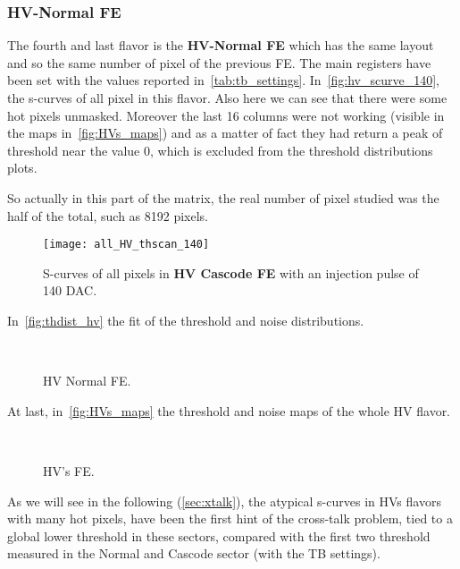 \subsubsection{HV-Normal FE}\label{sec:first_xtalk}

The fourth and last flavor is the \textbf{HV-Normal FE} which has the same layout and so the same number of pixel of the previous FE. The main registers have been set with the values reported in~\autoref{tab:tb_settings}.
In~\autoref{fig:hv_scurve_140}, the s-curves of all pixel in this flavor. Also here we can see that there were some hot pixels unmasked.
Moreover the last 16 columns were not working (visible in the maps in~\autoref{fig:HVs_maps}) and as a matter of fact they had return a peak of threshold near the value 0, which is excluded from the threshold distributions plots.

So actually in this part of the matrix, the real number of pixel studied was the half of the total, such as 8192 pixels.


\begin{figure}[h!]
\centering
\texttt{[image: all\_HV\_thscan\_140]}
\caption{S-curves of all pixels in \textbf{HV Cascode FE} with an injection pulse of 140 DAC.}
\label{fig:hv_scurve_140}
\end{figure}

In~\autoref{fig:thdist_hv} the fit of the threshold and noise distributions.

\begin{figure}[h!]
\centering
{}\quad
{}\\
\caption{HV Normal FE.}
\label{fig:thdist_hv}
\end{figure}

At last, in~\autoref{fig:HVs_maps} the threshold and noise maps of the whole HV flavor.

\begin{figure}[h!]
\centering
{}\quad
{}\\
\caption{HV's FE.}
\label{fig:HVs_maps}
\end{figure}

As we will see in the following (\autoref{sec:xtalk}), the atypical s-curves in HVs flavors with many hot pixels, have been the first hint of the cross-talk problem, tied to a global lower threshold in these sectors, compared with the first two threshold measured in the Normal and Cascode sector (with the TB settings). 


